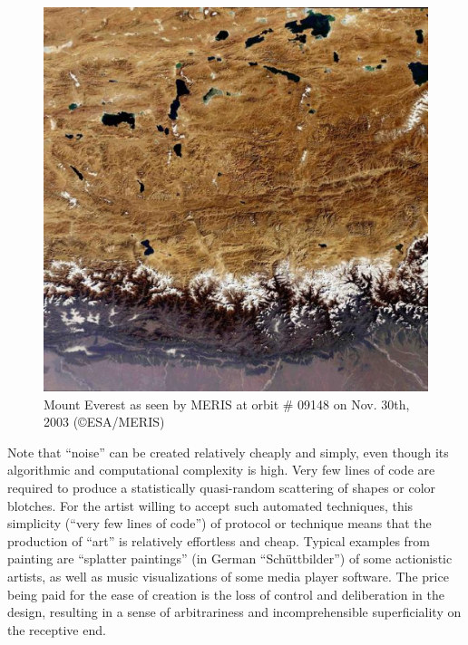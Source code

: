 \documentclass[rmp,amssymb,showpacs,showkeys,12pt,preprint]{revtex4}
\begin{document}
\begin{figure}
\centerline{\includegraphics[width=12cm]{2008-ae-China_MountEverest_MER_FR_Orbit09148_20031130_hires_s}}
   \caption{Mount Everest as seen by MERIS at orbit \# 09148 on Nov. 30th, 2003
(\copyright ESA/MERIS)}
   \label{2005-ae-China_MountEverest_MER_FR_Orbit09148_20031130_hires}
 \end{figure}





Note that ``noise'' can be created relatively cheaply and simply, even though its algorithmic and computational complexity is high.
Very few lines of code are required to produce a statistically quasi-random scattering of shapes or color blotches.
For the artist willing to accept such automated techniques, this simplicity (``very few lines of code'') of protocol or technique means that the production of ``art'' is relatively effortless and cheap.
Typical examples from painting are ``splatter paintings'' (in German ``Sch\"uttbilder'') of some actionistic artists,
as well as music visualizations of some media player software.
The price being paid for the ease of creation is the loss of control and deliberation in the design, resulting in a sense of arbitrariness and incomprehensible superficiality on the receptive end.
\end{document}

